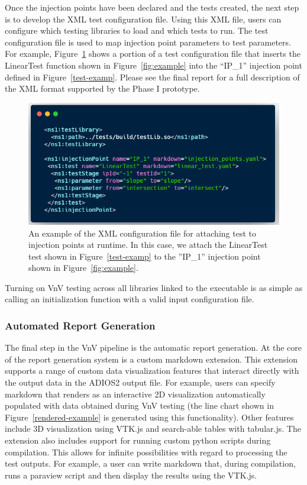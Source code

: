Once the injection points have been declared and the tests created, the next step is to develop the XML test configuration file. Using this XML file, users can configure which testing libraries to load and which tests to run. The test configuration file is used to map injection point parameters to test parameters. For example, Figure~\ref{test-xml} shows a portion of a test configuration file that inserts the LinearTest function shown in Figure~\ref{fig:example} into the ``IP\_1'' injection point defined in Figure~\ref{test-examp}. Please see the final report for a full description of the XML format supported by the Phase I prototype.

\begin{figure}
\centering
 \includegraphics[width=\textwidth]{./narrative/figures/test-xml1.png}
 \caption{An example of the XML configuration file for attaching test to injection points at runtime. In this case, we attach the LinearTest test shown in Figure~\ref{test-examp} to the ''IP\_1''
 injection point shown in Figure~\ref{fig:example}. \label{test-xml}}
\end{figure}

Turning on VnV testing across all libraries linked to the executable is as simple as calling an initialization function with a valid input configuration file.

\subsubsection{Automated Report Generation}

The final step in the VnV pipeline is the automatic report generation. At the core of the report generation system is a custom markdown extension. This extension supports a range of custom data visualization features that interact directly with the output data in the ADIOS2 output file. For example, users can specify markdown that renders as an interactive 2D visualization automatically populated with data obtained during VnV testing (the line chart shown in  Figure~\ref{rendered-example} is generated using this functionality). Other features include 3D visualization using VTK.js and search-able tables with tabular.js. The extension also includes support for running custom python scripts during compilation. This allows for infinite possibilities with regard to processing the test outputs. For example, a user can write markdown that, during compilation, runs a paraview script and then display the results using the VTK.js.   


